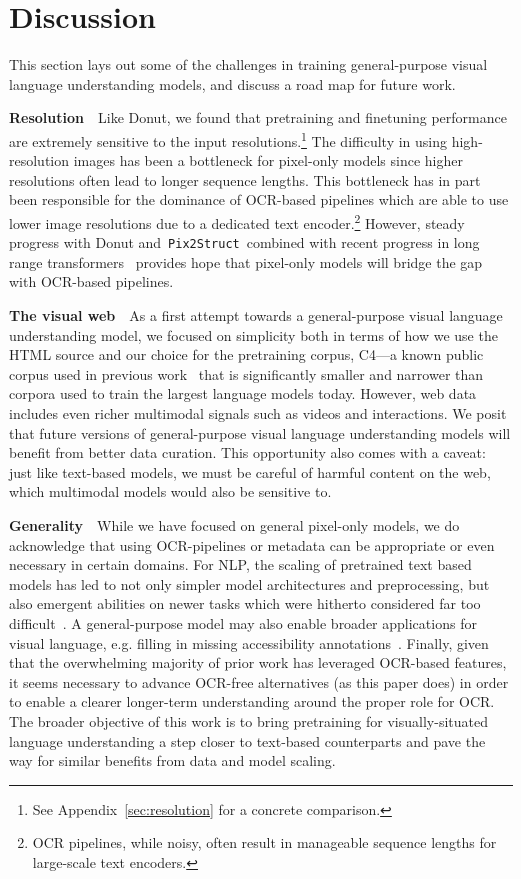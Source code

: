 \documentclass{article} %
\newcommand\ourmodel{{\texttt{Pix2Struct}}}
\begin{document}
\section{Discussion}
This section lays out some of the challenges in training general-purpose visual language understanding models, and discuss a road map for future work.

\textbf{Resolution}~~Like Donut, we found that pretraining and finetuning performance are extremely sensitive to the input resolutions.\footnote{See Appendix~\ref{sec:resolution} for a concrete comparison.} The difficulty in using high-resolution images has been a bottleneck for pixel-only models since higher resolutions often lead to longer sequence lengths. This bottleneck has in part been responsible for the dominance of OCR-based pipelines which are able to use lower image resolutions due to a dedicated text encoder.\footnote{OCR pipelines, while noisy, often result in manageable sequence lengths for large-scale text encoders.} However, steady progress with Donut and~\ourmodel~combined with recent progress in long range transformers~\citep{press2021train} provides hope that pixel-only models will bridge the gap with OCR-based pipelines.

\textbf{The visual web}~~As a first attempt towards a general-purpose visual language understanding model, we focused on simplicity both in terms of how we use the HTML source and our choice for the pretraining corpus, C4---a known public corpus used in previous work~\citep{t5} that is significantly smaller and narrower than corpora used to train the largest language models today. However, web data includes even richer multimodal signals such as videos and interactions. We posit that future versions of general-purpose visual language understanding models will benefit from better data curation. This opportunity also comes with a caveat: just like text-based models, we must be careful of harmful content on the web, which multimodal models would also be sensitive to.

\textbf{Generality}~~While we have focused on general pixel-only models, we do acknowledge that using OCR-pipelines or metadata can be appropriate or even necessary in certain domains. 
For NLP, the scaling of pretrained text based models has led to not only simpler model architectures and preprocessing, but also emergent abilities on newer tasks which were hitherto considered far too difficult~\citep{wei2022emergent}. A general-purpose model may also enable broader applications for visual language, e.g. filling in missing accessibility annotations~\citep{zhang2021screen}. 
Finally, given that the overwhelming majority of prior work has leveraged OCR-based features, it seems necessary to advance OCR-free alternatives (as this paper does) in order to enable a clearer longer-term understanding around the proper role for OCR.
The broader objective of this work is to bring pretraining for visually-situated language understanding a step closer to text-based counterparts and pave the way for similar benefits from data and model scaling. 
\end{document}

